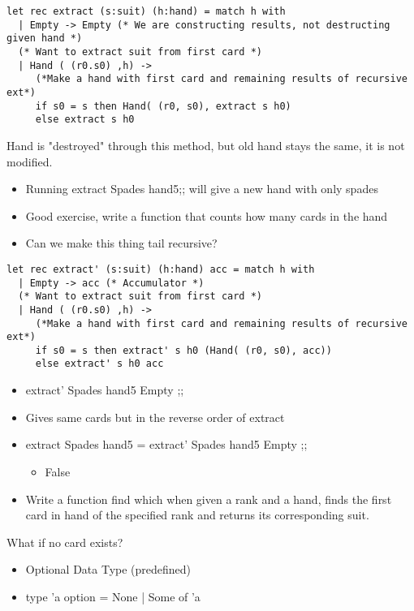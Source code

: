 \documentclass[11pt]{article}
\begin{document}
\begin{verbatim}
let rec extract (s:suit) (h:hand) = match h with
  | Empty -> Empty (* We are constructing results, not destructing given hand *)
  (* Want to extract suit from first card *)
  | Hand ( (r0.s0) ,h) -> 
     (*Make a hand with first card and remaining results of recursive ext*)
     if s0 = s then Hand( (r0, s0), extract s h0)
     else extract s h0
\end{verbatim}
Hand is "destroyed" through this method, but old hand stays the same, it is not modified.
\begin{itemize}
\item Running extract Spades hand5;; will give a new hand with only spades
\item Good exercise, write a function that counts how many cards in the hand
\item Can we make this thing tail recursive?
\end{itemize}

\begin{verbatim}
let rec extract' (s:suit) (h:hand) acc = match h with
  | Empty -> acc (* Accumulator *)
  (* Want to extract suit from first card *)
  | Hand ( (r0.s0) ,h) -> 
     (*Make a hand with first card and remaining results of recursive ext*)
     if s0 = s then extract' s h0 (Hand( (r0, s0), acc))
     else extract' s h0 acc
\end{verbatim}

\begin{itemize}
\item extract' Spades hand5 Empty ;;
\item Gives same cards but in the reverse order of extract
\item extract Spades hand5 = extract' Spades hand5 Empty ;;
\begin{itemize}
\item False
\end{itemize}

\item Write a function find which when given a rank and a hand, finds the first card in hand of the specified rank and returns its corresponding suit.
\end{itemize}
What if no card exists?
\begin{itemize}
\item Optional Data Type (predefined)
\item type 'a option = None | Some of 'a
\end{itemize}
\end{document}

